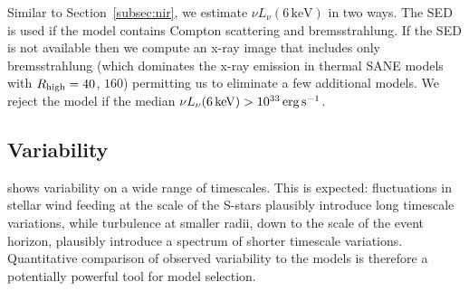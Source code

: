 Similar to Section~\ref{subsec:nir}, we estimate $\nu L_\nu(6\,\mathrm{keV})$ in two ways.  The SED is used if the model contains Compton scattering and bremsstrahlung.  If the SED is not available then we compute an x-ray image that includes only bremsstrahlung (which dominates the x-ray emission in thermal SANE models with $R_\mathrm{high} = 40$, $160$) permitting us to eliminate a few additional models.  We reject the model if the median $\nu L_\nu(6\,\mathrm{keV}) > 10^{33}\,\mathrm{erg\,s^{-1}}$.

\subsection{Variability}

%


\sgra shows variability on a wide range of timescales.  This is expected: fluctuations in stellar wind feeding at the scale of the S-stars plausibly introduce long timescale variations, while turbulence at smaller radii, down to the scale of the event horizon, plausibly introduce a spectrum of shorter timescale variations.  Quantitative comparison of observed variability to the models is therefore a potentially powerful tool for model selection.

